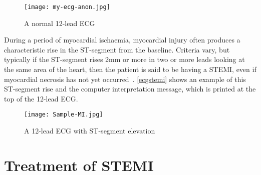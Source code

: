 \begin{figure}[htbp]
\centering
\texttt{[image: my-ecg-anon.jpg]}
\caption{A normal 12-lead ECG}
\label{ecgsegment}
\end{figure}




During a period of myocardial ischaemia, myocardial injury often produces a characteristic rise in the ST-segment from the baseline. Criteria vary, but typically if the ST-segment rises 2mm or more in two or more leads looking at the same area of the heart, then the patient is said to be having a STEMI, even if myocardial necrosis has not yet occurred~\citep{association_of_ambulance_chief_executives_uk_2013}. \autoref{ecgstemi} shows an example of this ST-segment rise and the computer interpretation message, which is printed at the top of the 12-lead ECG.

\begin{figure}[htbp]
\centering
\texttt{[image: Sample-MI.jpg]}
\caption{A 12-lead ECG with ST-segment elevation}
\label{ecgstemi}
\end{figure}



\section{Treatment of STEMI}
\label{treatmentofstemi}

